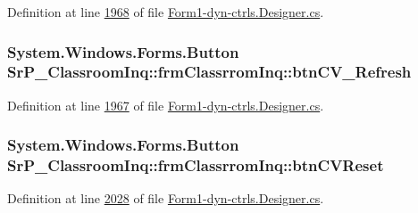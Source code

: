 \-Definition at line \hyperlink{_form1-dyn-ctrls_8_designer_8cs_source_l01968}{1968} of file \hyperlink{_form1-dyn-ctrls_8_designer_8cs_source}{\-Form1-\/dyn-\/ctrls.\-Designer.\-cs}.

\hypertarget{class_sr_p___classroom_inq_1_1frm_classrrom_inq_acab3b8f1dd8b8c6298dd2c11aa764a29}{
\subsubsection[{btn\-C\-V\-\_\-\-Refresh}]{\setlength{\rightskip}{0pt plus 5cm}\-System.\-Windows.\-Forms.\-Button {\bf \-Sr\-P\-\_\-\-Classroom\-Inq\-::frm\-Classrrom\-Inq\-::btn\-C\-V\-\_\-\-Refresh}}}
\label{class_sr_p___classroom_inq_1_1frm_classrrom_inq_acab3b8f1dd8b8c6298dd2c11aa764a29}


\-Definition at line \hyperlink{_form1-dyn-ctrls_8_designer_8cs_source_l01967}{1967} of file \hyperlink{_form1-dyn-ctrls_8_designer_8cs_source}{\-Form1-\/dyn-\/ctrls.\-Designer.\-cs}.

\hypertarget{class_sr_p___classroom_inq_1_1frm_classrrom_inq_a205b60ffd1a3a0dc4149e5562859031c}{
\subsubsection[{btn\-C\-V\-Reset}]{\setlength{\rightskip}{0pt plus 5cm}\-System.\-Windows.\-Forms.\-Button {\bf \-Sr\-P\-\_\-\-Classroom\-Inq\-::frm\-Classrrom\-Inq\-::btn\-C\-V\-Reset}}}
\label{class_sr_p___classroom_inq_1_1frm_classrrom_inq_a205b60ffd1a3a0dc4149e5562859031c}


\-Definition at line \hyperlink{_form1-dyn-ctrls_8_designer_8cs_source_l02028}{2028} of file \hyperlink{_form1-dyn-ctrls_8_designer_8cs_source}{\-Form1-\/dyn-\/ctrls.\-Designer.\-cs}.

